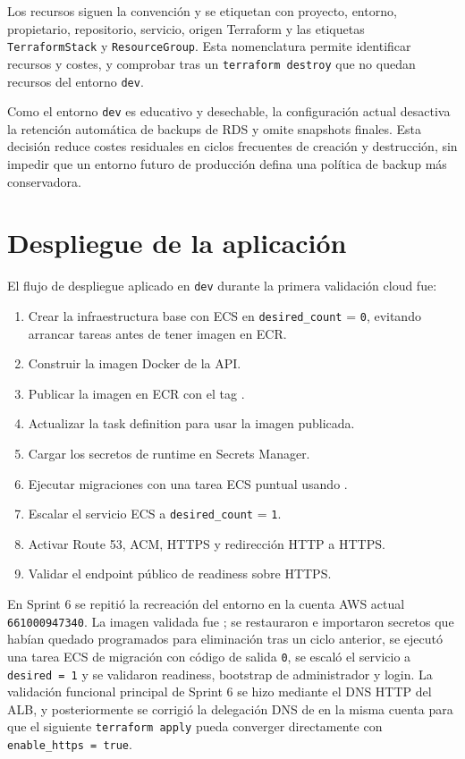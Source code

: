 Los recursos siguen la convención  y se etiquetan con proyecto, entorno, propietario, repositorio, servicio, origen Terraform y las etiquetas \texttt{TerraformStack} y \texttt{ResourceGroup}. Esta nomenclatura permite identificar recursos y costes, y comprobar tras un \texttt{terraform destroy} que no quedan recursos del entorno \texttt{dev}.

Como el entorno \texttt{dev} es educativo y desechable, la configuración actual desactiva la retención automática de backups de RDS y omite snapshots finales. Esta decisión reduce costes residuales en ciclos frecuentes de creación y destrucción, sin impedir que un entorno futuro de producción defina una política de backup más conservadora.

\section{Despliegue de la aplicación}
\label{sec:despliegue-aplicacion}

El flujo de despliegue aplicado en \texttt{dev} durante la primera validación cloud fue:

\begin{enumerate}
  \item Crear la infraestructura base con ECS en \texttt{desired\_count} = \texttt{0}, evitando arrancar tareas antes de tener imagen en ECR.
  \item Construir la imagen Docker de la API.
  \item Publicar la imagen en ECR con el tag .
  \item Actualizar la task definition para usar la imagen publicada.
  \item Cargar los secretos de runtime en Secrets Manager.
  \item Ejecutar migraciones con una tarea ECS puntual usando .
  \item Escalar el servicio ECS a \texttt{desired\_count} = \texttt{1}.
  \item Activar Route 53, ACM, HTTPS y redirección HTTP a HTTPS.
  \item Validar el endpoint público de readiness sobre HTTPS.
\end{enumerate}

En Sprint 6 se repitió la recreación del entorno en la cuenta AWS actual \texttt{661000947340}. La imagen validada fue ; se restauraron e importaron secretos que habían quedado programados para eliminación tras un ciclo anterior, se ejecutó una tarea ECS de migración con código de salida \texttt{0}, se escaló el servicio a \texttt{desired = 1} y se validaron readiness, bootstrap de administrador y login. La validación funcional principal de Sprint 6 se hizo mediante el DNS HTTP del ALB, y posteriormente se corrigió la delegación DNS de  en la misma cuenta para que el siguiente \texttt{terraform apply} pueda converger directamente con \texttt{enable\_https = true}.

